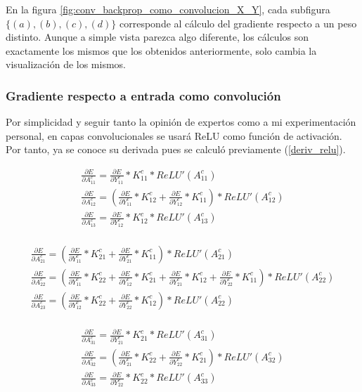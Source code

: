 En la figura \ref{fig:conv_backprop_como_convolucion_X_Y}, cada subfigura $\{(a), (b), (c), (d)\}$ corresponde al cálculo del gradiente respecto a un peso distinto. Aunque a simple vista parezca algo diferente, los cálculos son exactamente los mismos que los obtenidos anteriormente, solo cambia la visualización de los mismos.

\subsubsection{Gradiente respecto a entrada como convolución}

Por simplicidad y seguir tanto la opinión de expertos como a mi experimentación personal, en capas convolucionales se usará ReLU como función de activación. Por tanto, ya se conoce su derivada pues se calculó previamente (\ref{deriv_relu}).


\begin{gather}
	\frac{\partial E}{\partial A^c_{11}} = \frac{\partial E}{\partial Y^c_{11}} * K^c_{11} *  ReLU'(A^c_{11}) \\
	\frac{\partial E}{\partial A^c_{12}} = (\frac{\partial E}{\partial Y^c_{11}} * K^c_{12} + \frac{\partial E}{\partial Y^c_{12}} * K^c_{11}) * ReLU'(A^c_{12}) \\
	\frac{\partial E}{\partial A^c_{13}} = \frac{\partial E}{\partial Y^c_{12}} * K^c_{12} * ReLU'(A^c_{13}) \\
\end{gather}

\begin{gather}
	\frac{\partial E}{\partial A^c_{21}} = (\frac{\partial E}{\partial Y^c_{11}} * K^c_{21} + \frac{\partial E}{\partial Y^c_{21}} * K^c_{11}) * ReLU'(A^c_{21}) \\
	\frac{\partial E}{\partial A^c_{22}} = (\frac{\partial E}{\partial Y^c_{11}} * K^c_{22} + \frac{\partial E}{\partial Y^c_{12}} * K^c_{21} + \frac{\partial E}{\partial Y^c_{21}} * K^c_{12} + \frac{\partial E}{\partial Y^c_{22}} * K^c_{11}) * ReLU'(A^c_{22}) \\
	\frac{\partial E}{\partial A^c_{23}} = (\frac{\partial E}{\partial Y^c_{12}} * K^c_{22} + \frac{\partial E}{\partial Y^c_{22}} * K^c_{12}) * ReLU'(A^c_{22})\\
\end{gather}

\begin{gather}
	\frac{\partial E}{\partial A^c_{31}} = \frac{\partial E}{\partial Y^c_{21}} * K^c_{21} * ReLU'(A^c_{31})\\
	\frac{\partial E}{\partial A^c_{32}} = (\frac{\partial E}{\partial Y^c_{21}} * K^c_{22} + \frac{\partial E}{\partial Y^c_{22}} * K^c_{21}) * ReLU'(A^c_{32})\\
	\frac{\partial E}{\partial A^c_{33}} = \frac{\partial E}{\partial Y^c_{22}} * K^c_{22} * ReLU'(A^c_{33})
\end{gather}

